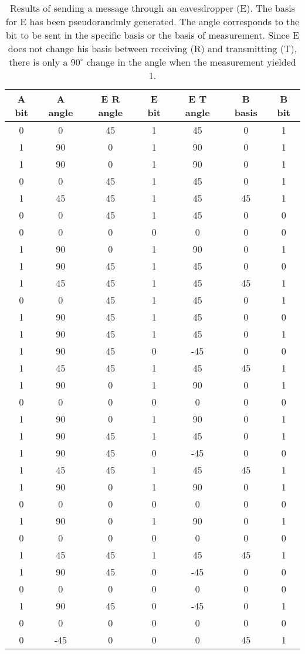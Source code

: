 \begin{table}
  \centering
  \caption{Results of sending a message through an eavesdropper (E). The basis for E has been
  pseudorandmly generated. The angle corresponds to the bit to be sent in the specific basis or the
basis of measurement. Since E does not change his basis between receiving (R) and transmitting (T),
there is only a $90^\circ$ change in the angle when the measurement yielded 1.}
  \label{tab:res:sending-sequence}
  \begin{tabular}{c | c | c | c | c | c | c}
    A bit &
    A angle &
    E R angle &
    E bit &
    E T angle &
    B basis &
    B bit \\
    \hline
    0&0&45&1&45&0&1 \\
    1&90&0&1&90&0&1 \\
    1&90&0&1&90&0&1 \\
    0&0&45&1&45&0&1 \\
    1&45&45&1&45&45&1 \\
    0&0&45&1&45&0&0 \\
    0&0&0&0&0&0&0 \\
    1&90&0&1&90&0&1 \\
    1&90&45&1&45&0&0  \\
    1&45&45&1&45&45&1 \\
    0&0&45&1&45&0&1 \\
    1&90&45&1&45&0&0  \\
    1&90&45&1&45&0&1  \\
    1&90&45&0&-45&0&0 \\
    1&45&45&1&45&45&1 \\
    1&90&0&1&90&0&1 \\
    0&0&0&0&0&0&0 \\
    1&90&0&1&90&0&1 \\
    1&90&45&1&45&0&1  \\
    1&90&45&0&-45&0&0 \\
    1&45&45&1&45&45&1 \\
    1&90&0&1&90&0&1 \\
    0&0&0&0&0&0&0 \\
    1&90&0&1&90&0&1 \\
    0&0&0&0&0&0&0 \\
    1&45&45&1&45&45&1 \\
    1&90&45&0&-45&0&0 \\
    0&0&0&0&0&0&0 \\
    1&90&45&0&-45&0&1 \\
    0&0&0&0&0&0&0 \\
    0&-45&0&0&0&45&1  \\
  \end{tabular}
\end{table}

